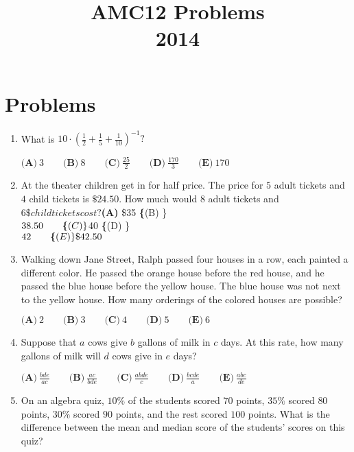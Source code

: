 \documentclass{article}
\title{AMC12 Problems \\ 2014}
\date{}
\begin{document}
\maketitle\thispagestyle{fancy}\newpage\section*{Problems}\begin{enumerate}[label=\arabic*., itemsep=0.5em]\item What is $10 \cdot \left(\tfrac{1}{2} + \tfrac{1}{5} + \tfrac{1}{10}\right)^{-1}?$

$ \textbf{(A)}\ 3\qquad\textbf{(B)}\ 8\qquad\textbf{(C)}\ \frac{25}{2}\qquad\textbf{(D)}\ \frac{170}{3}\qquad\textbf{(E)}\ 170$\par \vspace{0.5em}\item At the theater children get in for half price.  The price for $5$ adult tickets and $4$ child tickets is $\$24.50$.  How much would $8$ adult tickets and $6\$ child tickets cost?

$\textbf{(A) }\$35\qquad
\textbf\{(B) \}\\$38.50\qquad
\textbf\{(C) \}\\$40\qquad
\textbf\{(D) \}\\$42\qquad
\textbf\{(E) \}\$42.50$\par \vspace{0.5em}\item Walking down Jane Street, Ralph passed four houses in a row, each painted a different color. He passed the orange house before the red house, and he passed the blue house before the yellow house. The blue house was not next to the yellow house. How many orderings of the colored houses are possible?

$ \textbf{(A)}\ 2\qquad\textbf{(B)}\ 3\qquad\textbf{(C)}\ 4\qquad\textbf{(D)}\ 5\qquad\textbf{(E)}\ 6$\par \vspace{0.5em}\item Suppose that $a$ cows give $b$ gallons of milk in $c$ days. At this rate, how many gallons of milk will $d$ cows give in $e$ days?

$ \textbf{(A)}\ \frac{bde}{ac}\qquad\textbf{(B)}\ \frac{ac}{bde}\qquad\textbf{(C)}\ \frac{abde}{c}\qquad\textbf{(D)}\ \frac{bcde}{a}\qquad\textbf{(E)}\ \frac{abc}{de}$\par \vspace{0.5em}\item On an algebra quiz, $10\%$ of the students scored $70$ points, $35\%$ scored $80$ points, $30\%$ scored $90$ points, and the rest scored $100$ points. What is the difference between the mean and median score of the students' scores on this quiz?


\end{enumerate}
\end{document}

